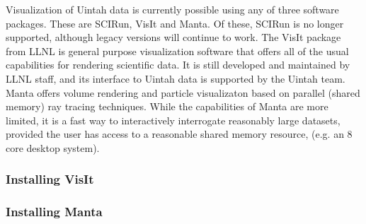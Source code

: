 Visualization of Uintah data is currently possible using any of three
software packages.  These are SCIRun, VisIt and Manta.  Of these, SCIRun is
no longer supported, although legacy versions will continue to work.  The
VisIt package from LLNL is general purpose visualization software that offers
all of the usual capabilities for rendering scientific data.  It is still
developed and maintained by LLNL staff, and its interface to Uintah data is
supported by the Uintah team.  Manta offers volume rendering and particle
visualizaton based on parallel (shared memory) ray tracing techniques.
While the capabilities of Manta are more limited, it is a fast way to
interactively interrogate reasonably large datasets, provided the user has
access to a reasonable shared memory resource, (e.g. an 8 core desktop system).

\subsubsection{Installing VisIt}

\subsubsection{Installing Manta}


